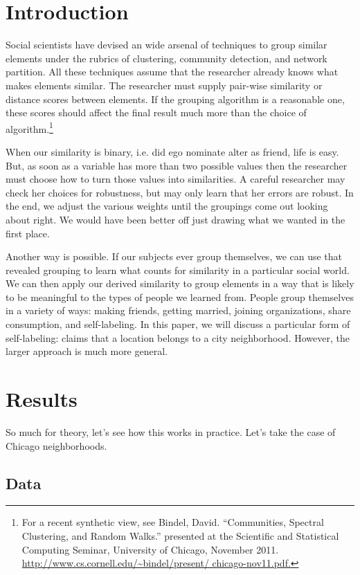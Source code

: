 \documentclass[12pt,letter]{article}\usepackage[]{graphicx}\usepackage[]{color}
\begin{document}
\section*{Introduction}
Social scientists have devised an wide arsenal of techniques to group
similar elements under the rubrics of clustering, community detection,
and network partition. All these techniques assume that the researcher
already knows what makes elements similar. The researcher must supply
pair-wise similarity or distance scores between elements. If the
grouping algorithm is a reasonable one, these scores should affect the
final result much more than the choice of algorithm.\footnote{For a
  recent synthetic view, see Bindel, David. ``Communities, Spectral
  Clustering, and Random Walks.'' presented at the Scientific and
  Statistical Computing Seminar, University of Chicago, November
  2011. \url{http://www.cs.cornell.edu/~bindel/present/
 chicago-nov11.pdf.}}

When our similarity is binary, i.e. did ego nominate alter as friend, life is
easy. But, as soon as a variable has more than two possible values then the
researcher must choose how to turn those values into similarities. A careful
researcher may check her choices for robustness, but may only learn that
her errors are robust. In the end, we adjust the various weights until the
groupings come out looking about right. We would have been better off just
drawing what we wanted in the first place.

Another way is possible. If our subjects ever group themselves, we can
use that revealed grouping to learn what counts for similarity in a particular
social world. We can then apply our derived similarity to group elements in
a way that is likely to be meaningful to the types of people we learned from.
People group themselves in a variety of ways: making friends, getting
married, joining organizations, share consumption, and self-labeling. In this
paper, we will discuss a particular form of self-labeling: claims that a location
belongs to a city neighborhood. However, the larger approach is much more
general.



\section*{Results}
So much for theory, let's see how this works in practice. Let's take
the case of Chicago neighborhoods.  

\subsection*{Data}
\end{document}
